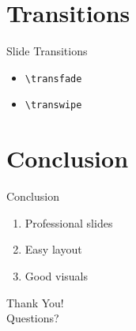\documentclass[aspectratio=169]{beamer}
\begin{document}
\section{Transitions}
\begin{frame}{Slide Transitions}\transfade
\begin{itemize}
\item \texttt{\textbackslash transfade}
\item \texttt{\textbackslash transwipe}
\end{itemize}
\end{frame}
\section{Conclusion}
\begin{frame}{Conclusion}\transfade
\begin{enumerate}
\item Professional slides
\item Easy layout
\item Good visuals
\end{enumerate}
\end{frame}
\begin{frame}[plain]\transfade\centering
\Huge Thank You!\\[0.5cm]
\Large Questions?
\end{frame}
\end{document}
